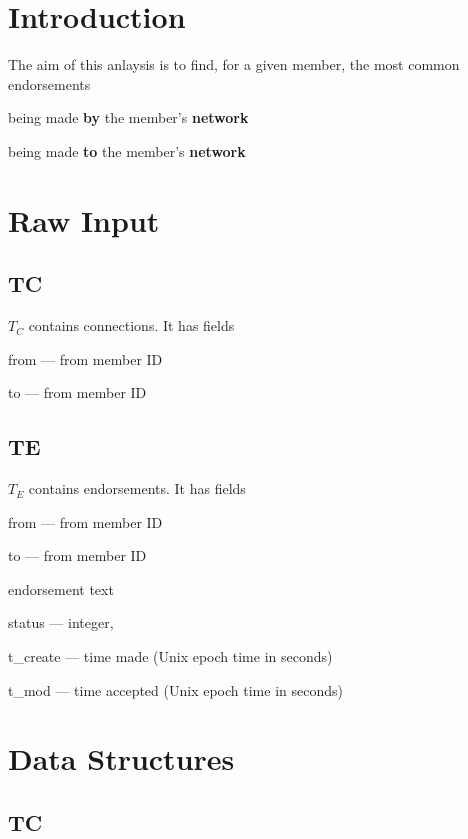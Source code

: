 
\section{Introduction}

The aim of this anlaysis is to find, for a given member, 
the most common endorsements 
\be
\item being made {\bf by} the member's {\bf network}
\item being made {\bf to} the member's {\bf network}
\ee

\section{Raw Input}

\subsection{TC}
\label{TC}

\(T_C\) contains connections. It has fields
\be
\item from --- from member ID 
\item   to --- from member ID 
\ee

\subsection{TE}
\label{T_E}

\(T_E\) contains endorsements. It has fields
\be
\item from --- from member ID 
\item   to --- from member ID 
\item endorsement text
\item status --- integer, \TBC
\item t\_create --- time made (Unix epoch time in seconds)
\item t\_mod --- time accepted (Unix epoch time in seconds)
\ee


\section{Data Structures}

\subsection{TC}
\label{TC_plp}

